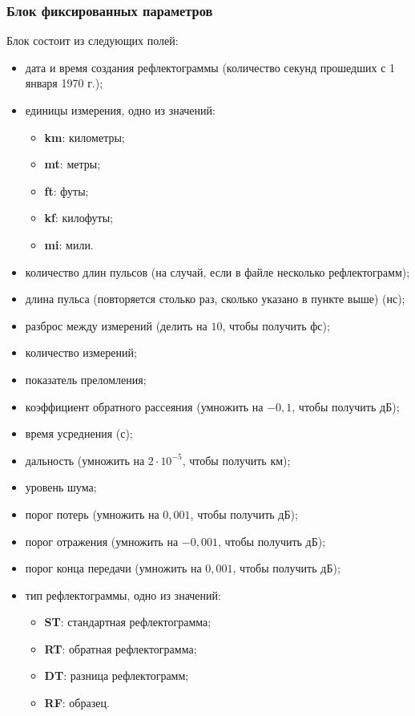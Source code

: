 \subsubsection{Блок фиксированных параметров}
\label{fixed_params_block}

Блок состоит из следующих полей:
\begin{itemize}
  \item дата и время создания рефлектограммы (количество секунд прошедших с 1 января 1970 г.);
  \item единицы измерения, одно из значений:
  \begin{itemize}
    \item \textbf{km}: километры;
    \item \textbf{mt}: метры;
    \item \textbf{ft}: футы;
    \item \textbf{kf}: килофуты;
    \item \textbf{mi}: мили.
  \end{itemize}
  \item количество длин пульсов (на случай, если в файле несколько рефлектограмм);
  \item длина пульса (повторяется столько раз, сколько указано в пункте выше) (нс);
  \item разброс между измерений (делить на $10$, чтобы получить фс);
  \item количество измерений;
  \item показатель преломления;
  \item коэффициент обратного рассеяния (умножить на $-0,1$, чтобы получить дБ);
  \item время усреднения (с);
  \item дальность (умножить на $2\cdot 10^{-5}$, чтобы получить км);
  \item уровень шума;
  \item порог потерь (умножить на $0,001$, чтобы получить дБ);
  \item порог отражения (умножить на $-0,001$, чтобы получить дБ);
  \item порог конца передачи (умножить на $0,001$, чтобы получить дБ);
  \item тип рефлектограммы, одно из значений:
  \begin{itemize}
    \item \textbf{ST}: стандартная рефлектограмма;
    \item \textbf{RT}: обратная рефлектограмма;
    \item \textbf{DT}: разница рефлектограмм;
    \item \textbf{RF}: образец.
  \end{itemize}
\end{itemize}

